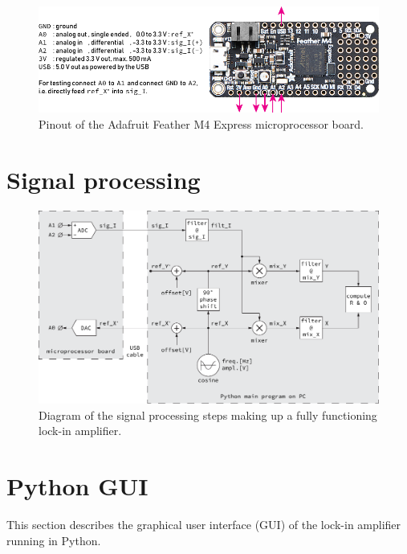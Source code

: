 \documentclass{article}
\begin{document}
\begin{figure}[h]\label{fig:pinout}
\includegraphics[width=\textwidth]{pinout_Adafruit_Feather_M4_Express.pdf}
\caption{Pinout of the Adafruit Feather M4 Express microprocessor board.}
\end{figure}

%
%

\section{Signal processing}

\begin{figure}[h]\label{fig:diagram}
\includegraphics[width=\textwidth]{diagram_signal_processing.pdf}
\caption{Diagram of the signal processing steps making up a fully functioning lock-in amplifier.}
\end{figure}

%
%

\newpage
\section{Python GUI}
This section describes the graphical user interface (GUI) of the lock-in amplifier running in Python.
\end{document}
